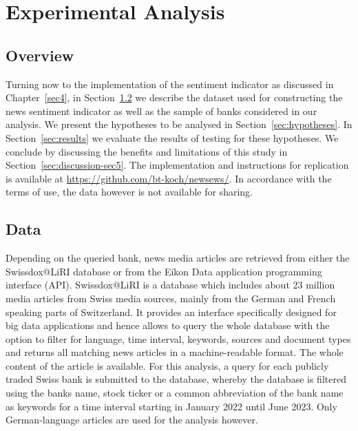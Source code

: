 \chapter{Experimental Analysis}\label{sec5}
\thispagestyle{empty}

\section{Overview}

Turning now to the implementation of the sentiment indicator as discussed in \mbox{Chapter~\ref{sec4}}, in \mbox{Section~\ref{sec:data}} we describe the dataset used for constructing the news sentiment indicator as well as the sample of banks considered in our analysis. We present the hypotheses to be analysed in \mbox{Section~\ref{sec:hypotheses}}. In \mbox{Section~\ref{sec:results}} we evaluate the results of testing for these hypotheses. We conclude by discussing the benefits and limitations of this study in \mbox{Section~\ref{sec:discussion-sec5}}. The implementation and instructions for replication is available at \url{https://github.com/bt-koch/newsews/}. In accordance with the terms of use, the data however is not available for sharing.

\section{Data} \label{sec:data}

Depending on the queried bank, news media articles are retrieved from either the Swissdox@LiRI database or from the Eikon Data application programming interface (API). Swissdox@LiRI is a database which includes about 23 million media articles from Swiss media sources, mainly from the German and French speaking parts of Switzerland. It provides an interface specifically designed for big data applications and hence allows to query the whole database with the option to filter for language, time interval, keywords, sources and document types and returns all matching news articles in a machine-readable format. The whole content of the article is available. For this analysis, a query for each publicly traded Swiss bank is submitted to the database, whereby the database is filtered using the banks name, stock ticker or a common abbreviation of the bank name as keywords for a time interval starting in January 2022 until June 2023. Only German-language articles are used for the analysis however. \\

